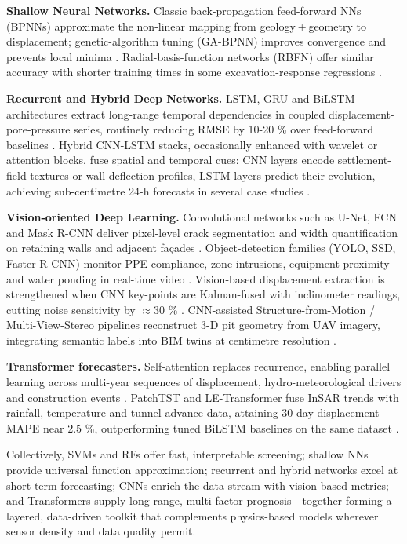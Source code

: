 \documentclass[preprint,11pt,authoryear,3p]{elsarticle}
\begin{document}
\textbf{Shallow Neural Networks.} Classic back-propagation feed-forward NNs (BPNNs) approximate the non-linear mapping from geology + geometry to displacement; genetic-algorithm tuning (GA-BPNN) improves convergence and prevents local minima \citep{LU2023139241}. Radial-basis-function networks (RBFN) offer similar accuracy with shorter training times in some excavation-response regressions \citep{zhou_performance_2021}.

\textbf{Recurrent and Hybrid Deep Networks.} LSTM, GRU and BiLSTM architectures extract long-range temporal dependencies in coupled displacement-pore-pressure series, routinely reducing RMSE by 10-20 \% over feed-forward baselines \citep{WU2023184,YANG2024,XIE2022101313,LI2023105243}. Hybrid CNN-LSTM stacks, occasionally enhanced with wavelet or attention blocks, fuse spatial and temporal cues: CNN layers encode settlement-field textures or wall-deflection profiles, LSTM layers predict their evolution, achieving sub-centimetre 24-h forecasts in several case studies \citep{zhao_spatiotemporal_2021,WANG2024105733,zhao2025early}.

\textbf{Vision-oriented Deep Learning.} Convolutional networks such as U-Net, FCN and Mask R-CNN deliver pixel-level crack segmentation and width quantification on retaining walls and adjacent façades \citep{https://doi.org/10.1002/stc.2981}. Object-detection families (YOLO, SSD, Faster-R-CNN) monitor PPE compliance, zone intrusions, equipment proximity and water ponding in real-time video \citep{LIU2022104302}. Vision-based displacement extraction is strengthened when CNN key-points are Kalman-fused with inclinometer readings, cutting noise sensitivity by $\approx$30 \% \citep{SHEN2023100442}. CNN-assisted Structure-from-Motion / Multi-View-Stereo pipelines reconstruct 3-D pit geometry from UAV imagery, integrating semantic labels into BIM twins at centimetre resolution \citep{WU2021103706,rs14205187}.

\textbf{Transformer forecasters.} Self-attention replaces recurrence, enabling parallel learning across multi-year sequences of displacement, hydro-meteorological drivers and construction events \citep{Vaswani2017Attention}. PatchTST and LE-Transformer fuse InSAR trends with rainfall, temperature and tunnel advance data, attaining 30-day displacement MAPE near 2.5 \%, outperforming tuned BiLSTM baselines on the same dataset \citep{Nie2023PatchTST,rs17061106}.

Collectively, SVMs and RFs offer fast, interpretable screening; shallow NNs provide universal function approximation; recurrent and hybrid networks excel at short-term forecasting; CNNs enrich the data stream with vision-based metrics; and Transformers supply long-range, multi-factor prognosis—together forming a layered, data-driven toolkit that complements physics-based models wherever sensor density and data quality permit.
\end{document}
